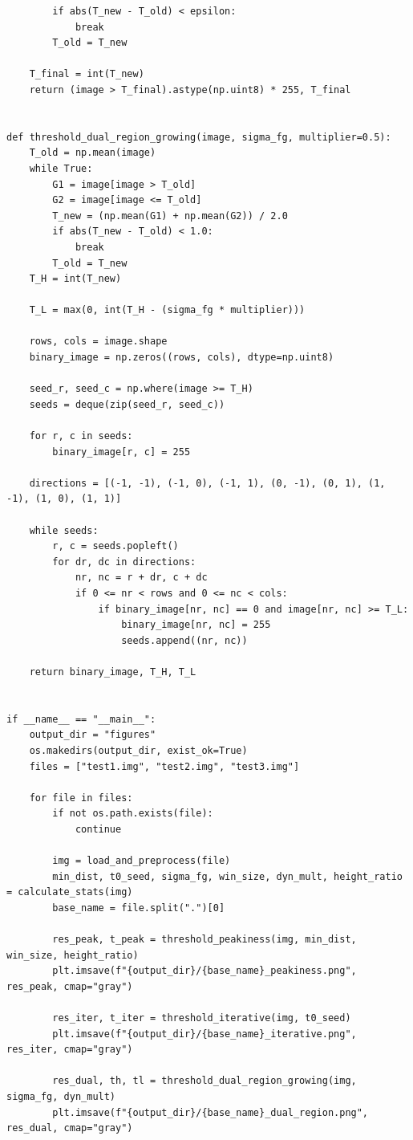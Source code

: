 \documentclass[11pt, letterpaper]{article}
\begin{document}
\begin{lstlisting}
        if abs(T_new - T_old) < epsilon:
            break
        T_old = T_new

    T_final = int(T_new)
    return (image > T_final).astype(np.uint8) * 255, T_final


def threshold_dual_region_growing(image, sigma_fg, multiplier=0.5):
    T_old = np.mean(image)
    while True:
        G1 = image[image > T_old]
        G2 = image[image <= T_old]
        T_new = (np.mean(G1) + np.mean(G2)) / 2.0
        if abs(T_new - T_old) < 1.0:
            break
        T_old = T_new
    T_H = int(T_new)

    T_L = max(0, int(T_H - (sigma_fg * multiplier)))

    rows, cols = image.shape
    binary_image = np.zeros((rows, cols), dtype=np.uint8)

    seed_r, seed_c = np.where(image >= T_H)
    seeds = deque(zip(seed_r, seed_c))

    for r, c in seeds:
        binary_image[r, c] = 255

    directions = [(-1, -1), (-1, 0), (-1, 1), (0, -1), (0, 1), (1, -1), (1, 0), (1, 1)]

    while seeds:
        r, c = seeds.popleft()
        for dr, dc in directions:
            nr, nc = r + dr, c + dc
            if 0 <= nr < rows and 0 <= nc < cols:
                if binary_image[nr, nc] == 0 and image[nr, nc] >= T_L:
                    binary_image[nr, nc] = 255
                    seeds.append((nr, nc))

    return binary_image, T_H, T_L


if __name__ == "__main__":
    output_dir = "figures"
    os.makedirs(output_dir, exist_ok=True)
    files = ["test1.img", "test2.img", "test3.img"]

    for file in files:
        if not os.path.exists(file):
            continue

        img = load_and_preprocess(file)
        min_dist, t0_seed, sigma_fg, win_size, dyn_mult, height_ratio = calculate_stats(img)
        base_name = file.split(".")[0]

        res_peak, t_peak = threshold_peakiness(img, min_dist, win_size, height_ratio)
        plt.imsave(f"{output_dir}/{base_name}_peakiness.png", res_peak, cmap="gray")

        res_iter, t_iter = threshold_iterative(img, t0_seed)
        plt.imsave(f"{output_dir}/{base_name}_iterative.png", res_iter, cmap="gray")

        res_dual, th, tl = threshold_dual_region_growing(img, sigma_fg, dyn_mult)
        plt.imsave(f"{output_dir}/{base_name}_dual_region.png", res_dual, cmap="gray")
\end{lstlisting}
\end{document}

